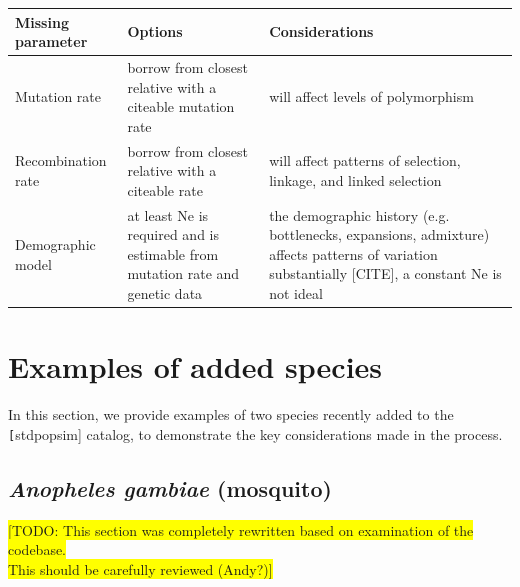 \documentclass[hidelinks]{article}
\begin{document}
\begin{table}[]
	\captionof{table}{Guide to missing parameters. \\
	\colorbox{yellow}{[TODO: reconsider table. Either clarify considerations or just defer to the text, which covers this quite clearly.}
	\colorbox{yellow}{Current version is too vague.}
} \label{tab:param-mod} 
	\begin{tabular}{p{1.5in}p{2.2in}p{2.2in}}
			\hline
			Missing parameter  & Options & Considerations \\
			\hline
			Mutation rate      & 
			borrow from closest relative with a citeable mutation rate & 
			will affect levels of polymorphism \\                                                                                          						\hline
			Recombination rate & 
			borrow from closest relative with a citeable rate &
			will affect patterns of selection, linkage, and linked selection
			\\
			\hline
			Demographic model & 
			at least Ne is required and is estimable from mutation rate and genetic data     & 
			the demographic history (e.g. bottlenecks, expansions, admixture) affects patterns of variation substantially {[}CITE{]}, a constant Ne is not ideal \\
			\hline
	\end{tabular}
\end{table}


\hypertarget{sec5}{%
	\section*{Examples of added species}\label{sec:std-sim}}

In this section, we provide examples of two species recently added to the \texttt[stdpopsim] catalog, to demonstrate the key considerations made in the process.

\hypertarget{ano-gambea}{%
	\subsection*{\texorpdfstring{\emph{Anopheles gambiae} (mosquito)}{Anopheles gambiae (mosquito)}}\label{bos-taurus}}

\colorbox{yellow}{[TODO: This section was completely rewritten based on examination of the codebase.}\\
\colorbox{yellow}{This should be carefully reviewed (Andy?)]}
\end{document}

